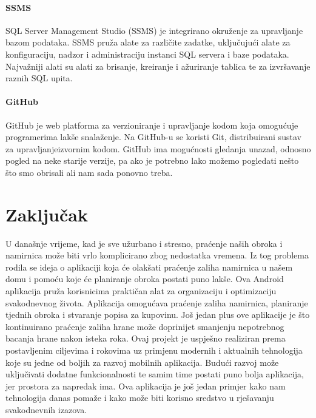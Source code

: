\documentclass[diplomskirad]{fer}
\begin{document}
\subsubsection{SSMS}
SQL Server Management Studio (SSMS) je integrirano okruženje za upravljanje bazom podataka. SSMS pruža alate za različite zadatke, uključujući alate za konfiguraciju, nadzor i administraciju instanci SQL servera i baze podataka. Najvažniji alati su alati za brisanje, kreiranje i ažuriranje tablica te za izvršavanje raznih SQL upita. \cite{SSMS}
\subsubsection{GitHub}
GitHub je web platforma za verzioniranje i upravljanje kodom koja omogućuje programerima lakše snalaženje. Na GitHub-u se koristi Git, distribuirani sustav za upravljanjeizvornim kodom. GitHub ima mogućnosti gledanja unazad, odnosno pogled na neke starije verzije, pa ako je potrebno lako možemo pogledati nešto što smo obrisali ali nam sada ponovno treba. \cite{GIT}

\label{pog:glavni_dio}






\chapter{Zaključak}
U današnje vrijeme, kad je sve užurbano i stresno, praćenje naših obroka i namirnica može biti vrlo komplicirano zbog nedostatka vremena. Iz tog problema rodila se ideja o aplikaciji koja će olakšati praćenje zaliha namirnica u našem domu i pomoću koje će planiranje obroka postati puno lakše. Ova Android aplikacija pruža korisnicima praktičan alat za organizaciju i optimizaciju svakodnevnog života. Aplikacija omogućava praćenje zaliha namirnica, planiranje tjednih obroka i stvaranje popisa za kupovinu. Još jedan plus ove aplikacije je što kontinuirano praćenje zaliha hrane može doprinijet smanjenju nepotrebnog bacanja hrane nakon isteka roka. Ovaj projekt je uspješno realiziran prema postavljenim ciljevima i rokovima uz primjenu modernih i aktualnih tehnologija koje su jedne od boljih za razvoj mobilnih aplikacija. Budući razvoj može uključivati dodatne funkcionalnosti te samim time postati puno bolja aplikacija, jer prostora za napredak ima. Ova aplikacija je još jedan primjer kako nam tehnologija danas pomaže i kako može biti korisno sredstvo u rješavanju svakodnevnih izazova.
\label{pog:zakljucak}
\end{document}
